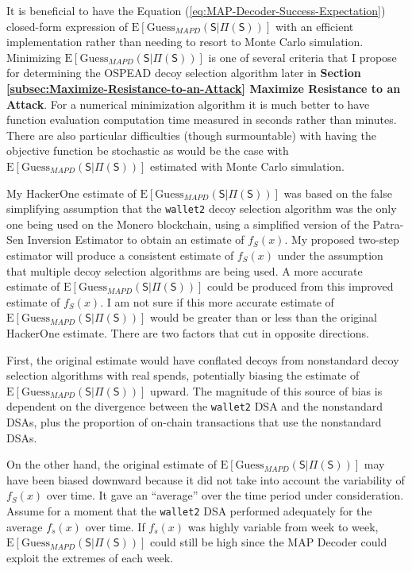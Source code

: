 \documentclass[english]{article}
\begin{document}
It is beneficial to have the Equation (\ref{eq:MAP-Decoder-Success-Expectation})
closed-form expression of $\mathrm{E}\left[\mathrm{Guess}_{MAPD}\left(\mathsf{S}|\Pi(\mathsf{S})\right)\right]$
with an efficient implementation rather than needing to resort to
Monte Carlo simulation. Minimizing $\mathrm{E}\left[\mathrm{Guess}_{MAPD}\left(\mathsf{S}|\Pi(\mathsf{S})\right)\right]$
is one of several criteria that I propose for determining the OSPEAD
decoy selection algorithm later in \textbf{Section \ref{subsec:Maximize-Resistance-to-an-Attack}
Maximize Resistance to an Attack}. For a numerical minimization algorithm
it is much better to have function evaluation computation time measured
in seconds rather than minutes. There are also particular difficulties
(though surmountable) with having the objective function be stochastic
as would be the case with $\mathrm{E}\left[\mathrm{Guess}_{MAPD}\left(\mathsf{S}|\Pi(\mathsf{S})\right)\right]$
estimated with Monte Carlo simulation.

My HackerOne estimate of $\mathrm{E}\left[\mathrm{Guess}_{MAPD}\left(\mathsf{S}|\Pi(\mathsf{S})\right)\right]$
was based on the false simplifying assumption that the \texttt{wallet2}
decoy selection algorithm was the only one being used on the Monero
blockchain, using a simplified version of the Patra-Sen Inversion
Estimator to obtain an estimate of $f_{S}(x)$. My proposed two-step
estimator will produce a consistent estimate of $f_{S}(x)$ under
the assumption that multiple decoy selection algorithms are being
used. A more accurate estimate of $\mathrm{E}\left[\mathrm{Guess}_{MAPD}\left(\mathsf{S}|\Pi(\mathsf{S})\right)\right]$
could be produced from this improved estimate of $f_{S}(x)$. I am
not sure if this more accurate estimate of $\mathrm{E}\left[\mathrm{Guess}_{MAPD}\left(\mathsf{S}|\Pi(\mathsf{S})\right)\right]$
would be greater than or less than the original HackerOne estimate.
There are two factors that cut in opposite directions.

First, the original estimate would have conflated decoys from nonstandard
decoy selection algorithms with real spends, potentially biasing the
estimate of $\mathrm{E}\left[\mathrm{Guess}_{MAPD}\left(\mathsf{S}|\Pi(\mathsf{S})\right)\right]$
upward. The magnitude of this source of bias is dependent on the divergence
between the \texttt{wallet2} DSA and the nonstandard DSAs, plus the
proportion of on-chain transactions that use the nonstandard DSAs.

On the other hand, the original estimate of $\mathrm{E}\left[\mathrm{Guess}_{MAPD}\left(\mathsf{S}|\Pi(\mathsf{S})\right)\right]$
may have been biased downward because it did not take into account
the variability of $f_{S}(x)$ over time. It gave an ``average''
over the time period under consideration. Assume for a moment that
the \texttt{wallet2} DSA performed adequately for the average $f_{s}(x)$
over time. If $f_{s}(x)$ was highly variable from week to week, $\mathrm{E}\left[\mathrm{Guess}_{MAPD}\left(\mathsf{S}|\Pi(\mathsf{S})\right)\right]$
could still be high since the MAP Decoder could exploit the extremes
of each week.
\end{document}
